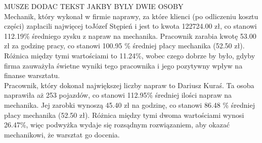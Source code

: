 \documentclass{article}\usepackage[]{graphicx}\usepackage[]{xcolor}
\begin{document}
MUSZE DODAC TEKST JAKBY BYLY DWIE OSOBY \\

Mechanik, który wykonał w firmie naprawy, za które klienci (po odliczeniu kosztu części) zapłacili najwięcej toJózef Stępień i jest to kwota 122724.00 zł, co stanowi 112.19\% średniego zysku z napraw na mechanika. Pracownik zarabia kwotę 53.00 zł za godzinę pracy, co stanowi 100.95 \% średniej płacy mechanika (52.50 zł). Różnica między tymi wartościami to 11.24\%, wobec czego dobrze by było, gdyby firma zauważyła świetne wyniki tego pracownika i jego pozytywny wpływ na finanse warsztatu. \\

Pracownik, który dokonał największej liczby napraw to Dariusz Kuraś. Ta osoba naprawiła aż 253 pojazdów, co stanowi 112.95\% średniej ilości napraw na mechanika. Jej zarobki wynoszą 45.40 zł na godzinę, co stanowi 86.48 \% średniej płacy mechanika (52.50 zł). Różnica między tymi dwoma wartościami wynosi 26.47\%, więc podwyżka wydaje się rozsądnym rozwiązaniem, aby okazać mechanikowi, że warsztat go docenia.
\end{document}
